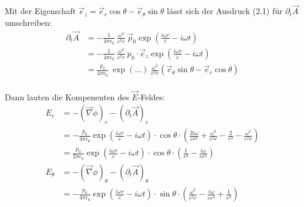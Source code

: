 \documentclass[11pt a4paper]{article}
\newcommand{\delt}{\partial_t}
\newcommand{\epsz}{\epsilon_0}
\newcommand{\grad}{\vec \nabla}
\begin{document}
Mit der Eigenschaft $\vec e_z = \vec e_r \cos\theta - \vec e_\theta \sin\theta$ lässt sich der 
Ausdruck (2.1) für $\delt \vec A$ umschreiben:
\begin{align*}
	\delt \vec A
	&= - \frac{1}{4\pi\epsz} \ \frac{\omega^2}{c^2 r} \ 
	\vec p_0 \exp\left(\frac{i\omega r}{c} - i\omega t \right) \\
	&= - \frac{1}{4\pi\epsz} \ \frac{\omega^2}{c^2 r} \ 
	p_0 \cdot \vec e_z \exp\left(\frac{i\omega r}{c} - i\omega t \right) \\
	&= \frac{p_0}{4\pi\epsz} \
	\exp(\hdots)  \
	\frac{\omega^2}{c^2 r} 
	\left(\vec e_\theta \sin\theta - \vec e_r \cos\theta \right)
	\\
\end{align*}

\newpage
Dann lauten die Kompenenten des $\vec E$-Feldes:
\begin{align*}
	E_r 
	&= -\left(\grad \phi \right)_r -\left(\delt \vec A \right)_r  \\
	&= - \frac{p_0}{4\pi\epsz} \exp\left(\frac{i\omega r}{c} - i\omega t \right) \cdot \cos\theta
	\cdot \left(\frac{2i\omega}{cr^2} + \frac{\omega^2}{c^2r} -\frac{2}{r^3} - \frac{\omega^2}{c^2r} \right) \\
	&= \frac{p_0}{2\pi\epsz} \exp\left(\frac{i\omega r}{c} - i\omega t \right) \cdot \cos\theta
	\cdot \left(\frac{1}{r^3} - \frac{i\omega}{cr^2} \right) \\
	E_\theta
	&= -\left(\grad \phi \right)_\theta -\left(\delt \vec A \right)_\theta  \\
	&= - \frac{p_0}{4\pi\epsz} \exp\left(\frac{i\omega r}{c} - i\omega t \right) \cdot \sin\theta
	\cdot \left(\frac{\omega^2}{c^2r} - \frac{i\omega}{cr^2} + \frac{1}{r^3} \right)
\end{align*}
\end{document}
